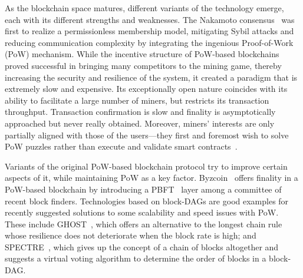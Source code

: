As the blockchain space matures, different variants of the technology emerge, each with its different strengths and weaknesses. The Nakamoto consensus~\cite{Bitcoin} was first to realize a permissionless membership model, mitigating Sybil attacks and reducing communication complexity by integrating the ingenious Proof-of-Work~\cite{PoW} (PoW) mechanism. While the incentive structure of PoW-based blockchains proved successful in bringing many competitors to the mining game, thereby increasing the security and resilience of the system, it created a paradigm that is extremely slow and expensive. Its exceptionally open nature coincides with its ability to facilitate a large number of miners, but restricts its transaction throughput. Transaction confirmation is slow and finality is asymptotically approached but never really obtained. Moreover, miners' interests are only partially aligned with those of the users---they first and foremost wish to solve PoW puzzles rather than execute and validate smart contracts~\cite{Verifier's_Dilemma}.

Variants of the original PoW-based blockchain protocol try to improve certain aspects of it, while maintaining PoW as a key factor. Byzcoin~\cite{Byzcoin} offers finality in a PoW-based blockchain by introducing a PBFT~\cite{PBFT} layer among a committee of recent block finders. Technologies based on block-DAGs are good examples for recently suggested solutions to some scalability and speed issues with PoW. These include %
GHOST~\cite{Ghost}, which offers an alternative to the longest chain rule whose resilience does not deteriorate when the block rate is high; and SPECTRE~\cite{Spectre}, which gives up the concept of a chain of blocks altogether and suggests a virtual voting algorithm to determine the order of blocks in a block-DAG.

